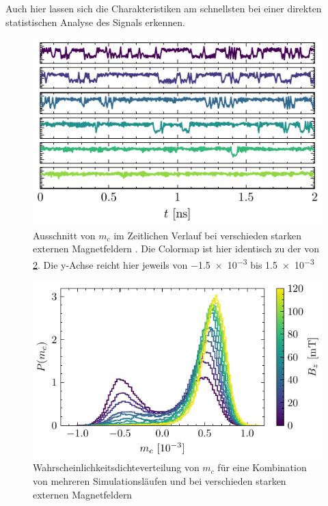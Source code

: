 \documentclass[main.tex]{subfiles}
\begin{document}
Auch hier lassen sich die Charakteristiken am schnellsten bei einer direkten statistischen Analyse des Signals erkennen.

\begin{figure}[H]
    \centering
    \includegraphics{bilder/plots/max_Bz/mc_time.pdf}
    \caption{Ausschnitt von \(m_c\) im Zeitlichen Verlauf bei verschieden starken externen Magnetfeldern . Die Colormap ist hier identisch zu der von \cref{fig:b-hist}. Die y-Achse reicht hier jeweils von \num{-1.5e-3} bis \num{+1.5e-3}}\label{fig:b-time}    
\end{figure}


\begin{figure}[H]
    \centering
    \includegraphics{bilder/plots/max_Bz/mc_hist.pdf}
    \caption{Wahrscheinlichkeitsdichteverteilung von \(m_c\) für eine Kombination von mehreren Simulationsläufen und bei verschieden starken externen Magnetfeldern}\label{fig:b-hist}    
\end{figure}
\end{document}

